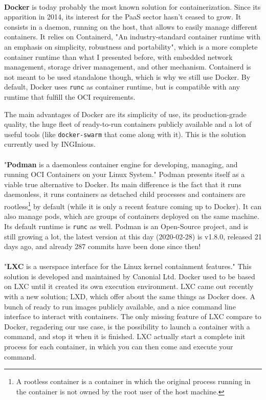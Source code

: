 \paragraph{}\textbf{Docker}\cite{merkel2014docker} is today probably the most known solution for containerization.  Since its apparition in 2014, its interest for the PaaS sector hasn't ceased to grow.  It consists in a daemon, running on the host, that allows to easily manage different containers.  It relies on Containerd, "An industry-standard container runtime with an emphasis on simplicity, robustness and portability"\cite{containerd}, which is a more complete container runtime than what I presented before, with embedded network management, storage driver management, and other mechanism.  Containerd is not meant to be used standalone though, which is why we still use Docker.  By default, Docker uses \texttt{runc} as container runtime, but is compatible with any runtime that fulfill the OCI\cite{oci} requirements.

The main advantages of Docker are its simplicity of use, its production-grade quality, the huge fleet of ready-to-run containers publicly available and a lot of useful tools (like \texttt{docker-swarm} that come along with it).  This is the solution currently used by INGInious.

\paragraph{}"\textbf{Podman} is a daemonless container engine for developing, managing, and running OCI\cite{oci} Containers on your Linux System."\cite{podman}  Podman presents itself as a viable true alternative to Docker.  Its main difference is the fact that it runs daemonless, it runs containers as detached child processes and containers are rootless\footnote{A rootless container is a container in which the original process running in the container is not owned by the root user of the host machine.} by default (while it is only a recent feature coming up to Docker).  It can also manage pods, which are groups of containers deployed on the same machine. Its default runtime is \texttt{runc} as well.  Podman is an Open-Source project, and is still growing a lot, the latest version at this day (2020-02-28) is v1.8.0, released 21 days ago, and already 287 commits have been done since then!

\paragraph{}"\textbf{LXC} is a userspace interface for the Linux kernel containment features."\cite{lxc}  This solution is developed and maintained by Canonial Ltd.  Docker used to be based on LXC until it created its own execution environment.  LXC came out recently with a new solution; LXD, which offer about the same things as Docker does.  A bunch of ready to run images publicly available, and a nice command line interface to interact with containers.  The only missing feature of LXC compare to Docker, regadering our use case, is the possibility to launch a container with a command, and stop it when it is finished.  LXC actually start a complete init process for each container, in which you can then come and execute your command.

